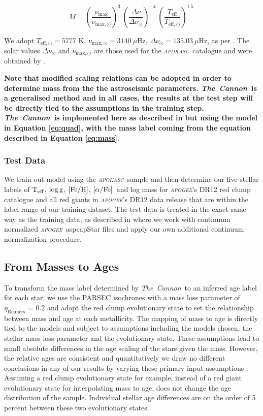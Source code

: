 \documentclass[12pt, preprint]{aastex}
\newcommand{\project}[1]{\textsl{#1}}
\newcommand{\tc}{\project{The~Cannon}}
\newcommand{\apogee}{\project{\textsc{apogee}}}
\newcommand{\apokasc}{\project{\textsc{apokasc}}}
\newcommand{\teff}{\mbox{$\rm T_{eff}$}}
\newcommand{\feh}{\mbox{$\rm [Fe/H]$}}
\newcommand{\alphafe}{\mbox{$\rm [\alpha/Fe]$}}
\newcommand{\logg}{\mbox{$\rm \log g$}}
\begin{document}
\begin{equation} \label{eq:mass}
M= \left( \frac{\nu_{\mathrm{max}}}{\nu_{\mathrm{max,\odot}}}\right)^3\  \left( \frac{\Delta \nu}{\Delta \nu_{\odot}}\right)^{-4} \ \left( \frac{T_{\mathrm{eff}}}{T_{\mathrm{eff,\odot}}}\right)^{1.5} \ 
\end{equation}

We adopt  $T_{\mathrm{eff,\odot}}=5777$ K, $\nu_{\mathrm{max,\odot}}=3140\ \mu$Hz, $\Delta \nu_{\odot}=135.03\ \mu$Hz, as per \citet{Martig2014}. The solar values  $\Delta \nu_{\odot}$ and $\nu_{\mathrm{max,\odot}}$ are those used for the \apokasc\ catalogue and were obtained by \cite{Hekker2013}.

\textbf{Note that modified scaling relations can be adopted in order to determine mass from the the astroseismic parameters. \tc\ is a generalised method and in all cases, the results at the test step will be directly tied to the assumptions in the training step. \tc\ is implemented here as described in \citet{Ness2015} but using the model in Equation \ref{eq:quad}, with the mass label coming from the equation described in Equation \ref{eq:mass}}.  

\subsubsection{Test Data} 

We train out model using the \apokasc\ sample and then determine our five stellar labels of \teff, \logg, \feh, \alphafe\ and log mass for \apogee's DR12 red clump catalogue \citet{Bovy2014} and all red giants in \apogee's DR12 data release that are within the label range of our training dataset.  The test data is treated in the exact same way as the training data, as described in \citet{Ness2015} where we work with continuum normalized \apogee\ aspcapStar files and apply our own additional continuum normalization procedure. 

\subsection{From Masses to Ages}

To transform the mass label determined by \tc\ to an inferred age label for each star, we use the PARSEC isochrones with a mass loss parameter of $\eta_{\mbox{Reimers}}$ = 0.2 and adopt the red clump evolutionary state to set the relationship between mass and age at each metallicity.  The mapping of mass to age is directly tied to the models and subject to assumptions including the models chosen, the stellar mass loss parameter and the evolutionary state. These assumptions lead to small absolute differences in the age scaling of the stars given the mass. However,  the relative ages are consistent and quantitatively we draw no different conclusions in any of our results by varying these primary input assumptions \citep[see also][]{Bovy2014}. Assuming a red clump evolutionary state for example, instead of a red giant evolutionary state for interpolating mass to age, does not change the age distribution of the sample. Individual stellar age differences are on the order of 5\,percent between these two evolutionary states. 
\end{document}
